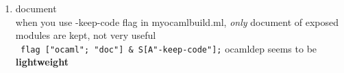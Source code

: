\begin{enumerate}
\begin{enumerate}
\begin{redcode}
bash$ cat foo.itarget
\end{redcode}

\begin{bluecode}
main.native
main.byte
stuff.docdir/index.html
\end{bluecode}


\textbf{ ocamlbuild foo.otarget}

\item packing modules


\begin{redcode}
$ cat foo.mlpack
\end{redcode}

\begin{bluecode}
Bar
Baz 
\end{bluecode}


\item document \\
  when you use -keep-code flag in myocamlbuild.ml, \textit{only} document of exposed modules are kept, not very useful \\
  \verb| flag ["ocaml"; "doc"] & S[A"-keep-code"];|
  ocamldep seems to be \textbf{ lightweight}


\end{enumerate}
\end{enumerate}
